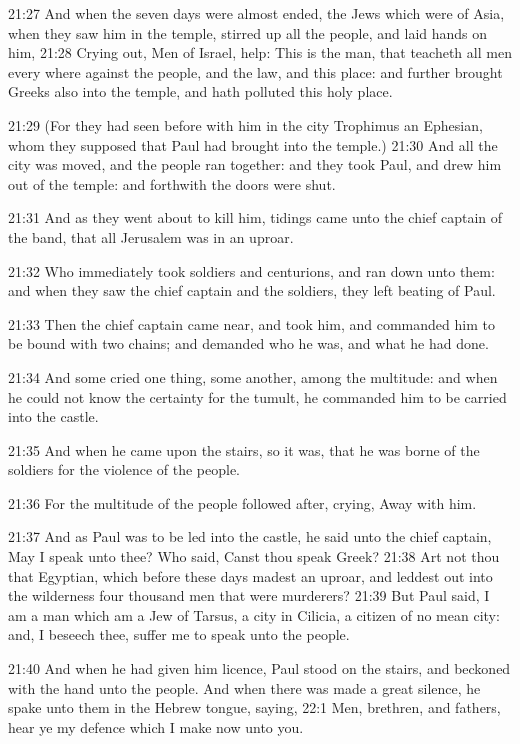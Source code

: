 21:27 And when the seven days were almost ended, the Jews which were of Asia, when they saw him in the temple, stirred up all the people, and laid hands on him, 21:28 Crying out, Men of Israel, help: This is the man, that teacheth all men every where against the people, and the law, and this place: and further brought Greeks also into the temple, and hath polluted this holy place.

21:29 (For they had seen before with him in the city Trophimus an Ephesian, whom they supposed that Paul had brought into the temple.)  21:30 And all the city was moved, and the people ran together: and they took Paul, and drew him out of the temple: and forthwith the doors were shut.

21:31 And as they went about to kill him, tidings came unto the chief captain of the band, that all Jerusalem was in an uproar.

21:32 Who immediately took soldiers and centurions, and ran down unto them: and when they saw the chief captain and the soldiers, they left beating of Paul.

21:33 Then the chief captain came near, and took him, and commanded him to be bound with two chains; and demanded who he was, and what he had done.

21:34 And some cried one thing, some another, among the multitude: and when he could not know the certainty for the tumult, he commanded him to be carried into the castle.

21:35 And when he came upon the stairs, so it was, that he was borne of the soldiers for the violence of the people.

21:36 For the multitude of the people followed after, crying, Away with him.

21:37 And as Paul was to be led into the castle, he said unto the chief captain, May I speak unto thee? Who said, Canst thou speak Greek?  21:38 Art not thou that Egyptian, which before these days madest an uproar, and leddest out into the wilderness four thousand men that were murderers?  21:39 But Paul said, I am a man which am a Jew of Tarsus, a city in Cilicia, a citizen of no mean city: and, I beseech thee, suffer me to speak unto the people.

21:40 And when he had given him licence, Paul stood on the stairs, and beckoned with the hand unto the people. And when there was made a great silence, he spake unto them in the Hebrew tongue, saying, 22:1 Men, brethren, and fathers, hear ye my defence which I make now unto you.

